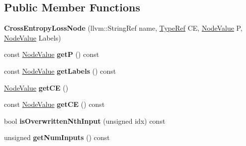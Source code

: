 \subsection*{Public Member Functions}
\begin{DoxyCompactItemize}
\item 
\mbox{\label{classglow_1_1_cross_entropy_loss_node_a269798839b120f8eb36e4d9d00b62cb2}} 
{\bfseries Cross\+Entropy\+Loss\+Node} (llvm\+::\+String\+Ref name, \hyperlink{structglow_1_1_type}{Type\+Ref} CE, \hyperlink{structglow_1_1_node_value}{Node\+Value} P, \hyperlink{structglow_1_1_node_value}{Node\+Value} Labels)
\item 
\mbox{\label{classglow_1_1_cross_entropy_loss_node_a5cb71e917933bffa639f987687871206}} 
const \hyperlink{structglow_1_1_node_value}{Node\+Value} {\bfseries getP} () const
\item 
\mbox{\label{classglow_1_1_cross_entropy_loss_node_a1258bbf29ebeb955a1fc4d6ddb872289}} 
const \hyperlink{structglow_1_1_node_value}{Node\+Value} {\bfseries get\+Labels} () const
\item 
\mbox{\label{classglow_1_1_cross_entropy_loss_node_a66287769113fa8b7f1b3770e960691b6}} 
\hyperlink{structglow_1_1_node_value}{Node\+Value} {\bfseries get\+CE} ()
\item 
\mbox{\label{classglow_1_1_cross_entropy_loss_node_aa2c439c80bdaf9afcdcce6f95df43e7b}} 
const \hyperlink{structglow_1_1_node_value}{Node\+Value} {\bfseries get\+CE} () const
\item 
\mbox{\label{classglow_1_1_cross_entropy_loss_node_a7cb9ae4724c8105952ca97d455457185}} 
bool {\bfseries is\+Overwritten\+Nth\+Input} (unsigned idx) const
\item 
\mbox{\label{classglow_1_1_cross_entropy_loss_node_a26e0c6bfa89453f41f248dc559819515}} 
unsigned {\bfseries get\+Num\+Inputs} () const
\item 
\mbox{\label{classglow_1_1_cross_entropy_loss_node_a19a1046d5b2bacbbcdbbf0e2107b631c}} 

\end{DoxyCompactItemize}
